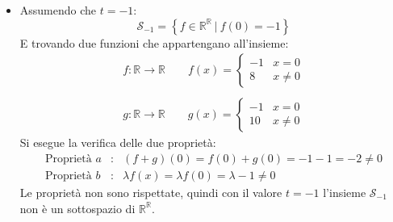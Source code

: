 \documentclass[a4paper]{article}
\begin{document}
\begin{itemize}
		\item Assumendo che $t = -1$:
		\begin{equation*}
			\mathscr{S}_{-1} = \left\{f \in \mathbb{R^{R}} \: | \: f\left(0\right) = -1\right\}
		\end{equation*}
		E trovando due funzioni che appartengano all'insieme:
		\begin{gather*}
			f : \mathbb{R} \rightarrow \mathbb{R} \hspace{2em} f\left(x\right) = \begin{cases}
				-1 & x = 0 \\
				8 & x \ne 0
			\end{cases} \\
			\\
			g : \mathbb{R} \rightarrow \mathbb{R} \hspace{2em} g\left(x\right) = \begin{cases}
				-1 & x = 0 \\
				10 & x \ne 0
			\end{cases}
		\end{gather*}
		Si esegue la verifica delle due proprietà:
		\begin{equation*}
			\begin{array}{lll}
				\text{Proprietà }a & : & \left(f + g\right)\left(0\right) = f\left(0\right) + g\left(0\right) = -1-1 = -2 \ne 0 \\ [0.5em]
				\text{Proprietà }b & : & \lambda f\left(x\right) = \lambda f\left(0\right) = \lambda -1 \ne 0
			\end{array}
		\end{equation*}
		Le proprietà non sono rispettate, quindi con il valore $t = -1$ l'insieme $\mathscr{S}_{-1}$ non è un sottospazio di $\mathbb{R^{R}}$.\newpage
		

\end{itemize}
\end{document}
